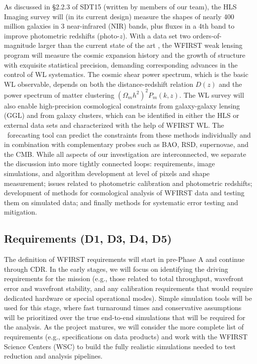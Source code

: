 %
%

As discussed in \S 2.2.3 of SDT15 (written by members of our team), the
HLS Imaging survey will (in its current design) measure the shapes of
nearly 400 million galaxies in 3 near-infrared (NIR) bands, plus fluxes in a 4th band
to improve photometric redshifts (photo-$z$).  With a data set two orders-of-magnitude
larger than the current state of the art \cite{2012MNRAS.427..146H,Becker2015},
the WFIRST weak lensing program will
measure the cosmic expansion history and the growth of structure with
exquisite statistical precision, demanding corresponding advances in the
control of WL systematics.  The cosmic shear power spectrum, which is the
basic WL observable, depends on both the distance-redshift relation $D(z)$
and the power spectrum of matter clustering $(\Omega_m h^2)^2 P_m(k,z)$.
The WL survey will also enable high-precision cosmological constraints
from galaxy-galaxy lensing (GGL) and from galaxy clusters, which can be
identified in either the HLS or external data sets and characterized with
the help of WFIRST WL.  The \CoLi\ forecasting tool can predict the constraints
from these methods individually and in combination with complementary
probes such as BAO, RSD, supernovae, and the CMB.
While all aspects of our investigation are interconnected, we
separate the discussion into more tightly connected loops: requirements,
image simulations, and algorithm development at level of pixels and shape measurement;
issues related to photometric calibration and photometric redshifts;
development of methods for cosmological analysis of WFIRST
data and testing them on simulated data; and finally methods for
systematic error testing and mitigation.

\subsection{Requirements (D1, D3, D4, D5)}
\label{sec:wl_requirements}

The definition of WFIRST requirements will
start in pre-Phase A and continue through
CDR. In the early stages, we will focus on identifying the driving requirements for the
mission (e.g., those related to total throughput, wavefront error and wavefront stability,
and any calibration requirements that would require dedicated hardware or special operational modes).
Simple simulation tools will be used for this stage, where fast turnaround times and
conservative assumptions will be prioritized over the true end-to-end simulations that
will be required for the analysis. As the project matures, we will consider the more
complete list of requirements (e.g., specifications on data products)
and work with the WFIRST Science Centers (WSC) to build the fully
realistic simulations needed to test reduction and analysis pipelines.

